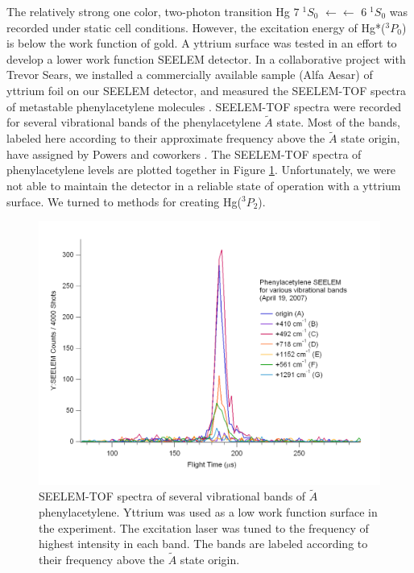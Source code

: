 \documentclass[12pt]{mitthesis}
\begin{document}
The relatively strong one color, two-photon transition Hg $7 \; ^1S_0$
$\leftarrow\leftarrow$ $6 \; ^1S_0$ was recorded under static cell
conditions.  However, the excitation energy of Hg*($^3P_0$) is below
the work function of gold.  A yttrium surface was tested in an effort
to develop a lower work function SEELEM detector.  In a collaborative
project with Trevor Sears, we installed a commercially available
sample (Alfa Aesar) of yttrium foil on our SEELEM detector, and
measured the SEELEM-TOF spectra of metastable phenylacetylene
molecules \cite{hofstein08}.  SEELEM-TOF spectra were recorded for
several vibrational bands of the phenylacetylene $\tilde{A}$ state.
Most of the bands, labeled here according to their approximate
frequency above the $\tilde{A}$ state origin, have assigned by Powers
and coworkers \cite{powers81}.  The SEELEM-TOF spectra of
phenylacetylene levels are plotted together in Figure
\ref{fig:phenylacetylene-tofs}.  Unfortunately, we were not able to
maintain the detector in a reliable state of operation with a yttrium
surface.  We turned to methods for creating Hg($^3P_2$).

\begin{figure}
  \caption{SEELEM-TOF spectra of several vibrational bands of
    $\tilde{A}$ phenylacetylene.  Yttrium was used as a low work
    function surface in the experiment.  The excitation laser was
    tuned to the frequency of highest intensity in each band.  The
    bands are labeled according to their frequency above the
    $\tilde{A}$ state origin.}
  \label{fig:phenylacetylene-tofs}
  \centering
  \includegraphics[width=8in,angle=90]{phenylacetylene-tofs.pdf}
\end{figure}
\end{document}
